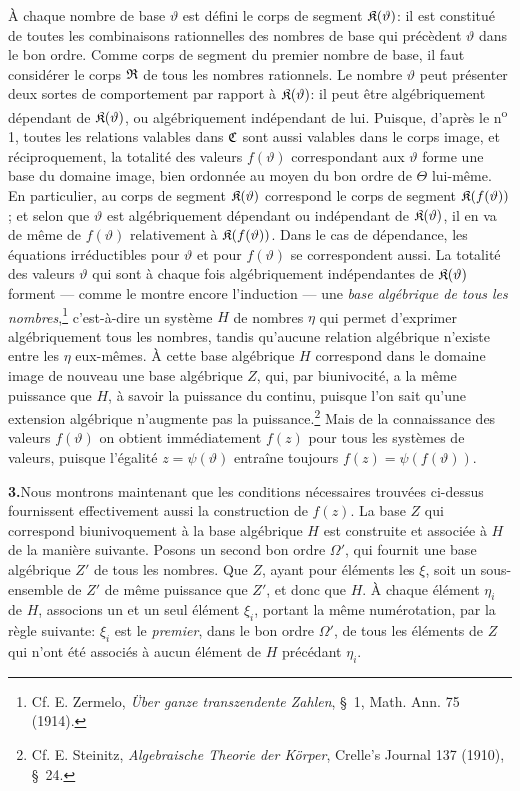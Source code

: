 À chaque nombre de base $\vartheta$ est défini le \og{}corps de segment $\mathfrak{K}(\vartheta)$\fg{}: il est constitué de toutes les combinaisons rationnelles des nombres de base qui précèdent $\vartheta$ dans le bon ordre. Comme corps de segment du premier nombre de base, il faut considérer le corps $\mathfrak{R}$ de tous les nombres rationnels. Le nombre $\vartheta$ peut présenter deux sortes de comportement par rapport à $\mathfrak{K}(\vartheta)$: il peut être algébriquement dépendant de $\mathfrak{K}(\vartheta)$, ou algébriquement indépendant de lui. Puisque, d'après le n\textsuperscript{o} 1, toutes les relations valables dans $\mathfrak{C}$ sont aussi valables dans le corps image, et réciproquement, la totalité des valeurs $f(\vartheta)$ correspondant aux $\vartheta$ forme une base du domaine image, bien ordonnée au moyen du bon ordre de $\Theta$ lui-même. En particulier, au corps de segment $\mathfrak{K}(\vartheta)$ correspond le corps de segment $\mathfrak{K}(f(\vartheta))$; et selon que $\vartheta$ est algébriquement dépendant ou indépendant de $\mathfrak{K}(\vartheta)$, il en va de même de $f(\vartheta)$ relativement à $\mathfrak{K}(f(\vartheta))$. Dans le cas de dépendance, les équations irréductibles pour $\vartheta$ et pour $f(\vartheta)$ se correspondent aussi. La totalité des valeurs $\vartheta$ qui sont à chaque fois algébriquement indépendantes de $\mathfrak{K}(\vartheta)$ forment --- comme le montre encore l'induction --- une \emph{base algébrique de tous les nombres},\footnote{Cf. E. Zermelo, \emph{Über ganze transzendente Zahlen}, \S\ 1, Math. Ann. 75 (1914).} c'est-à-dire un système $H$ de nombres $\eta$ qui permet d'exprimer algébriquement tous les nombres, tandis qu'aucune relation algébrique n'existe entre les $\eta$ eux-mêmes. À cette base algébrique $H$ correspond dans le domaine image de nouveau une base algébrique $Z$, qui, par biunivocité, a la même puissance que $H$, à savoir la puissance du continu, puisque l'on sait qu'une extension algébrique n'augmente pas la puissance.\footnote{Cf. E. Steinitz, \emph{Algebraische Theorie der Körper}, Crelle's Journal 137 (1910), \S\ 24.} Mais de la connaissance des valeurs $f(\vartheta)$ on obtient immédiatement $f(z)$ pour tous les systèmes de valeurs, puisque l'égalité $z=\psi(\vartheta)$ entraîne toujours $f(z)=\psi(f(\vartheta))$.

\medskip
\noindent\textbf{3.}\quad Nous montrons maintenant que les conditions nécessaires trouvées ci-dessus fournissent effectivement aussi la construction de $f(z)$. La base $Z$ qui correspond biunivoquement à la base algébrique $H$ est construite et associée à $H$ de la manière suivante. Posons un second bon ordre $\Omega'$, qui fournit une base algébrique $Z'$ de tous les nombres. Que $Z$, ayant pour éléments les $\xi$, soit un sous-ensemble de $Z'$ de même puissance que $Z'$, et donc que $H$. À chaque élément $\eta_i$ de $H$, associons un et un seul élément $\xi_i$, portant la même numérotation, par la règle suivante: $\xi_i$ est le \emph{premier}, dans le bon ordre $\Omega'$, de tous les éléments de $Z$ qui n'ont été associés à aucun élément de $H$ précédant $\eta_i$.


